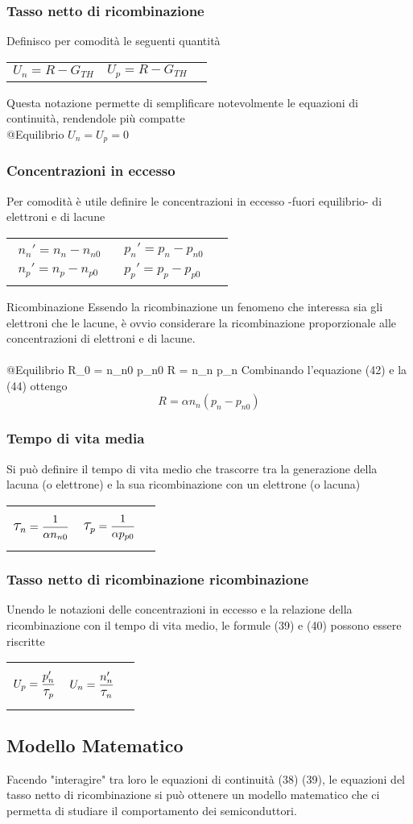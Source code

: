 \documentclass[12pt,a4paper]{article}
\makeatletter
\newcommand{\Tau}{ \mathlarger{\mathlarger{ \tau }}}
\newcommand{\deqlist}[5]{
	\subsubsection*{#1}
	
	\parbox{19cm}{#2}
	
	\noindent\begin{tabularx}{\textwidth}{@{}XXX@{}}
	\begin{equation}
	#3
	\end{equation}  & 
	\begin{equation}
	#4
	\end{equation}
	
	\end{tabularx}
	
	\noindent\parbox{19cm}{#5}}
\makeatother
\begin{document}
		\deqlist{Tasso netto di ricombinazione}
		{Definisco per comodità le seguenti quantità}
		{U_{n} = R-G_{TH}}
		{U_{p} = R-G_{TH}}
		{Questa notazione permette di semplificare notevolmente le equazioni di continuità, rendendole più compatte \\ @Equilibrio $ U_{n} = U_{p}=0 $}
		
		\deqlist{Concentrazioni in eccesso}
		{Per comodità è utile definire le concentrazioni in eccesso -fuori equilibrio- di elettroni e di lacune}
		{\begin{split}
			n_{n}' = n_{n} - n_{n0} 
			\\ n_{p}' = n_{p} - n_{p0}
			\end{split}
		}
		{\begin{split}
			p_{n}' = p_{n} - p_{n0} 
			\\ p_{p}' = p_{p} - p_{p0}
			\end{split}
		}
	
		\deqlist{Ricombinazione}
		{Essendo la ricombinazione un fenomeno che interessa sia gli elettroni che le lacune, è ovvio considerare la ricombinazione proporzionale alle concentrazioni di elettroni e di lacune. \\ \\ @Equilibrio}
		{R_{0} = \alpha n_{n0} p_{n0}}
		{R = \alpha n_{n} p_{n}}
		{Combinando l'equazione (42) e la (44) ottengo \[ R = \alpha n_{n} (p_{n}-p_{n0}) \]}
		
		
		\deqlist{Tempo di vita media}
		{Si può definire il tempo di vita medio che trascorre tra la generazione della lacuna (o elettrone) e la sua ricombinazione con un elettrone (o lacuna)}
		{\Tau_{n} = \frac{1}{\alpha n_{n0}}}
		{\Tau_{p} = \frac{1}{\alpha p_{p0}}}
		{}
		
		
		\deqlist{Tasso netto di ricombinazione ricombinazione}
		{Unendo le notazioni delle concentrazioni in eccesso e la relazione della ricombinazione con il tempo di vita medio, le formule (39) e (40) possono essere riscritte}
		{ U_{p} = \frac{p_{n}'}{\Tau_{p}} }
		{ U_{n} = \frac{n_{n}'}{\Tau_{n}} }
		{}
		
		
	\subsection{Modello Matematico}		
		Facendo "interagire" tra loro le equazioni di continuità (38) (39), le equazioni del tasso netto di ricombinazione si può ottenere un modello matematico che ci permetta di studiare il comportamento dei semiconduttori. 
		
\end{document}
